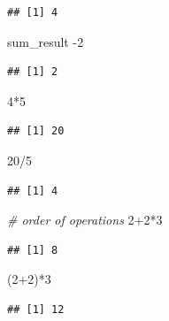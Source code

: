 \documentclass[
  12pt,
]{style/krantz}
\newenvironment{Shaded}{\begin{snugshade}}{\end{snugshade}}
\newcommand{\CommentTok}[1]{\textcolor[rgb]{0.56,0.35,0.01}{\textit{#1}}}
\newcommand{\DecValTok}[1]{\textcolor[rgb]{0.00,0.00,0.81}{#1}}
\newcommand{\NormalTok}[1]{#1}
\newcommand{\SpecialCharTok}[1]{\textcolor[rgb]{0.00,0.00,0.00}{#1}}
\begin{document}
\begin{verbatim}
## [1] 4
\end{verbatim}

\begin{Shaded}
\begin{Highlighting}[]
\NormalTok{sum\_result }\SpecialCharTok{{-}}\DecValTok{2}
\end{Highlighting}
\end{Shaded}

\begin{verbatim}
## [1] 2
\end{verbatim}

\begin{Shaded}
\begin{Highlighting}[]
\DecValTok{4}\SpecialCharTok{*}\DecValTok{5}
\end{Highlighting}
\end{Shaded}

\begin{verbatim}
## [1] 20
\end{verbatim}

\begin{Shaded}
\begin{Highlighting}[]
\DecValTok{20}\SpecialCharTok{/}\DecValTok{5}
\end{Highlighting}
\end{Shaded}

\begin{verbatim}
## [1] 4
\end{verbatim}

\begin{Shaded}
\begin{Highlighting}[]
\CommentTok{\# order of operations}
\DecValTok{2}\SpecialCharTok{+}\DecValTok{2}\SpecialCharTok{*}\DecValTok{3}
\end{Highlighting}
\end{Shaded}

\begin{verbatim}
## [1] 8
\end{verbatim}

\begin{Shaded}
\begin{Highlighting}[]
\NormalTok{(}\DecValTok{2}\SpecialCharTok{+}\DecValTok{2}\NormalTok{)}\SpecialCharTok{*}\DecValTok{3}
\end{Highlighting}
\end{Shaded}

\begin{verbatim}
## [1] 12
\end{verbatim}
\end{document}
